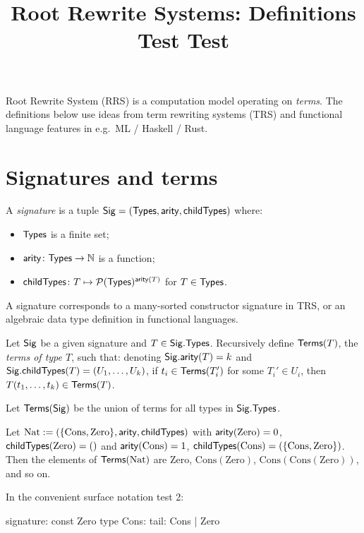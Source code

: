 \documentclass[11pt]{article}
\title{Root Rewrite Systems: Definitions Test Test}
\author{}
\date{}
\begin{document}
\maketitle

Root Rewrite System (RRS) is a computation model operating on \emph{terms}. The
definitions below use ideas from term rewriting systems (TRS) and functional
language features in e.g.\ ML / Haskell / Rust.

\section{Signatures and terms}

\begin{definition}[Signature]
A \emph{signature} is a tuple $\mathsf{Sig} = (\mathsf{Types}, \mathsf{arity}, \mathsf{childTypes})$ where:
\begin{itemize}
  \item $\mathsf{Types}$ is a finite set;
  \item $\mathsf{arity} \colon \mathsf{Types} \to \mathbb{N}$ is a function;
  \item $\mathsf{childTypes} \colon T \mapsto \mathcal{P}(\mathsf{Types})^{\mathsf{arity}(T)}$ for
        $T \in \mathsf{Types}$.
\end{itemize}
\end{definition}

\begin{note}
A signature corresponds to a many-sorted constructor signature in TRS, or an
algebraic data type definition in functional languages.
\end{note}

\begin{definition}[Terms]
Let $\mathsf{Sig}$ be a given signature and $T \in \mathsf{Sig}.\mathsf{Types}$. Recursively define
$\mathsf{Terms}(T)$, the \emph{terms of type $T$}, such that: denoting
$\mathsf{Sig}.\mathsf{arity}(T) = k$ and $\mathsf{Sig}.\mathsf{childTypes}(T) = (U_1, \dots, U_k)$, if
$t_i \in \mathsf{Terms}(T_i')$ for some $T_i' \in U_i$, then
$T(t_1, \dots, t_k) \in \mathsf{Terms}(T)$.

Let $\mathsf{Terms}(\mathsf{Sig})$ be the union of terms for all types in $\mathsf{Sig}.\mathsf{Types}$.
\end{definition}

\begin{example}
Let $\mathrm{Nat} := (\{\mathrm{Cons}, \mathrm{Zero}\}, \mathsf{arity}, \mathsf{childTypes})$ with
$\mathsf{arity}(\mathrm{Zero}) = 0$, $\mathsf{childTypes}(\mathrm{Zero}) = ()$ and
$\mathsf{arity}(\mathrm{Cons}) = 1$,
$\mathsf{childTypes}(\mathrm{Cons}) = (\{\mathrm{Cons}, \mathrm{Zero}\})$. Then the
elements of $\mathsf{Terms}(\mathrm{Nat})$ are $\mathrm{Zero}$, $\mathrm{Cons}(\mathrm{Zero})$,
$\mathrm{Cons}(\mathrm{Cons}(\mathrm{Zero}))$, and so on.

In the convenient surface notation test 2:
\begin{rrscode}
signature:
    const Zero
    type Cons:
        tail: Cons | Zero
\end{rrscode}
\end{example}
\end{document}
